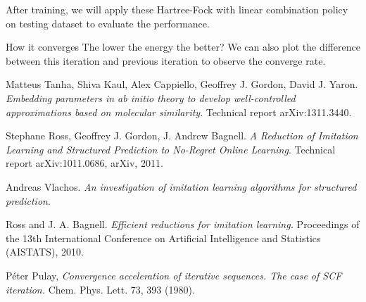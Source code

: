 \documentclass[twoside]{article}
\begin{document}
After training, we will apply these Hartree-Fock with linear combination policy on testing dataset to evaluate the performance.

How it converges
The lower the energy the better?
We can also plot the difference between this iteration and previous iteration to observe the converge rate.




\begin{thebibliography}{9}
  Matteus Tanha, Shiva Kaul, Alex Cappiello, Geoffrey J. Gordon, David J. Yaron.
  \emph{Embedding parameters in ab initio theory to develop well-controlled approximations based on molecular similarity}.
  Technical report arXiv:1311.3440.
  
  Stephane Ross, Geoffrey J. Gordon, J. Andrew Bagnell.
  \emph{A Reduction of Imitation Learning and Structured Prediction to No-Regret Online Learning}.
  Technical report arXiv:1011.0686, arXiv, 2011.
  
  Andreas Vlachos.
  \emph{An investigation of imitation learning algorithms for structured prediction}.
  
    Ross and J. A. Bagnell.
  \emph{Efficient reductions for imitation
learning.} Proceedings of the 13th International
Conference on Artificial Intelligence and Statistics (AISTATS),
2010.

   Péter Pulay,
  \emph{Convergence acceleration of iterative sequences. The case of SCF iteration.} Chem. Phys. Lett. 73, 393 (1980).

\end{thebibliography}
\end{document}
